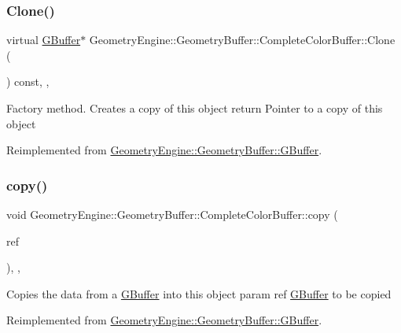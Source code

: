 \subsubsection{\texorpdfstring{Clone()}{Clone()}}
{\footnotesize\ttfamily virtual \mbox{\hyperlink{class_geometry_engine_1_1_geometry_buffer_1_1_g_buffer}{G\+Buffer}}$\ast$ Geometry\+Engine\+::\+Geometry\+Buffer\+::\+Complete\+Color\+Buffer\+::\+Clone (\begin{DoxyParamCaption}{ }\end{DoxyParamCaption}) const\hspace{0.3cm}{\ttfamily [inline]}, {\ttfamily [override]}, {\ttfamily [virtual]}}

Factory method. Creates a copy of this object return Pointer to a copy of this object 

Reimplemented from \mbox{\hyperlink{class_geometry_engine_1_1_geometry_buffer_1_1_g_buffer_af993f8c23f7e78051f3071be4873af9d}{Geometry\+Engine\+::\+Geometry\+Buffer\+::\+G\+Buffer}}.

\mbox{\label{class_geometry_engine_1_1_geometry_buffer_1_1_complete_color_buffer_a0630be352a9267083d42802fb22ae36b}} 
\subsubsection{\texorpdfstring{copy()}{copy()}}
{\footnotesize\ttfamily void Geometry\+Engine\+::\+Geometry\+Buffer\+::\+Complete\+Color\+Buffer\+::copy (\begin{DoxyParamCaption}\item[{const \mbox{\hyperlink{class_geometry_engine_1_1_geometry_buffer_1_1_g_buffer}{G\+Buffer}} \&}]{ref }\end{DoxyParamCaption})\hspace{0.3cm}{\ttfamily [override]}, {\ttfamily [protected]}, {\ttfamily [virtual]}}

Copies the data from a \mbox{\hyperlink{class_geometry_engine_1_1_geometry_buffer_1_1_g_buffer}{G\+Buffer}} into this object param ref \mbox{\hyperlink{class_geometry_engine_1_1_geometry_buffer_1_1_g_buffer}{G\+Buffer}} to be copied 

Reimplemented from \mbox{\hyperlink{class_geometry_engine_1_1_geometry_buffer_1_1_g_buffer_a9f20eb78703ef048d59a54f90ee09f25}{Geometry\+Engine\+::\+Geometry\+Buffer\+::\+G\+Buffer}}.



